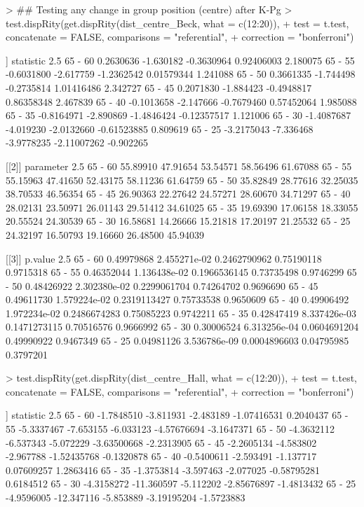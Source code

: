 \documentclass{article}
\begin{document}
\begin{Schunk}
\begin{Sinput}
> ## Testing any change in group position (centre) after K-Pg
> test.dispRity(get.dispRity(dist_centre_Beck, what = c(12:20)),
+     test = t.test, concatenate = FALSE, comparisons = "referential",
+     correction = "bonferroni")
\end{Sinput}
\begin{Soutput}
[[1]]
         statistic      2.5%        25%         75%     97.5%
65 - 60  0.2630636 -1.630182 -0.3630964  0.92406003  2.180075
65 - 55 -0.6031800 -2.617759 -1.2362542  0.01579344  1.241088
65 - 50  0.3661335 -1.744498 -0.2735814  1.01416486  2.342727
65 - 45  0.2071830 -1.884423 -0.4948817  0.86358348  2.467839
65 - 40 -0.1013658 -2.147666 -0.7679460  0.57452064  1.985088
65 - 35 -0.8164971 -2.890869 -1.4846424 -0.12357517  1.121006
65 - 30 -1.4087687 -4.019230 -2.0132660 -0.61523885  0.809619
65 - 25 -3.2175043 -7.336468 -3.9778235 -2.11007262 -0.902265

[[2]]
        parameter     2.5%      25%      75%    97.5%
65 - 60  55.89910 47.91654 53.54571 58.56496 61.67088
65 - 55  55.15963 47.41650 52.43175 58.11236 61.64759
65 - 50  35.82849 28.77616 32.25035 38.70533 46.56354
65 - 45  26.90363 22.27642 24.57271 28.60670 34.71297
65 - 40  28.02131 23.50971 26.01143 29.51412 34.61025
65 - 35  19.69390 17.06158 18.33055 20.55524 24.30539
65 - 30  16.58681 14.26666 15.21818 17.20197 21.25532
65 - 25  24.32197 16.50793 19.16660 26.48500 45.94039

[[3]]
           p.value         2.5%          25%        75%     97.5%
65 - 60 0.49979868 2.455271e-02 0.2462790962 0.75190118 0.9715318
65 - 55 0.46352044 1.136438e-02 0.1966536145 0.73735498 0.9746299
65 - 50 0.48426922 2.302380e-02 0.2299061704 0.74264702 0.9696690
65 - 45 0.49611730 1.579224e-02 0.2319113427 0.75733538 0.9650609
65 - 40 0.49906492 1.972234e-02 0.2486674283 0.75085223 0.9742211
65 - 35 0.42847419 8.337426e-03 0.1471273115 0.70516576 0.9666992
65 - 30 0.30006524 6.313256e-04 0.0604691204 0.49990922 0.9467349
65 - 25 0.04981126 3.536786e-09 0.0004896603 0.04795985 0.3797201
\end{Soutput}
\begin{Sinput}
> test.dispRity(get.dispRity(dist_centre_Hall, what = c(12:20)),
+     test = t.test, concatenate = FALSE, comparisons = "referential",
+     correction = "bonferroni")
\end{Sinput}
\begin{Soutput}
[[1]]
         statistic       2.5%       25%         75%      97.5%
65 - 60 -1.7848510  -3.811931 -2.483189 -1.07416531  0.2040437
65 - 55 -5.3337467  -7.653155 -6.033123 -4.57676694 -3.1647371
65 - 50 -4.3632112  -6.537343 -5.072229 -3.63500668 -2.2313905
65 - 45 -2.2605134  -4.583802 -2.967788 -1.52435768 -0.1320878
65 - 40 -0.5400611  -2.593491 -1.137717  0.07609257  1.2863416
65 - 35 -1.3753814  -3.597463 -2.077025 -0.58795281  0.6184512
65 - 30 -4.3158272 -11.360597 -5.112202 -2.85676897 -1.4813432
65 - 25 -4.9596005 -12.347116 -5.853889 -3.19195204 -1.5723883


\end{Soutput}
\end{Schunk}
\end{document}
